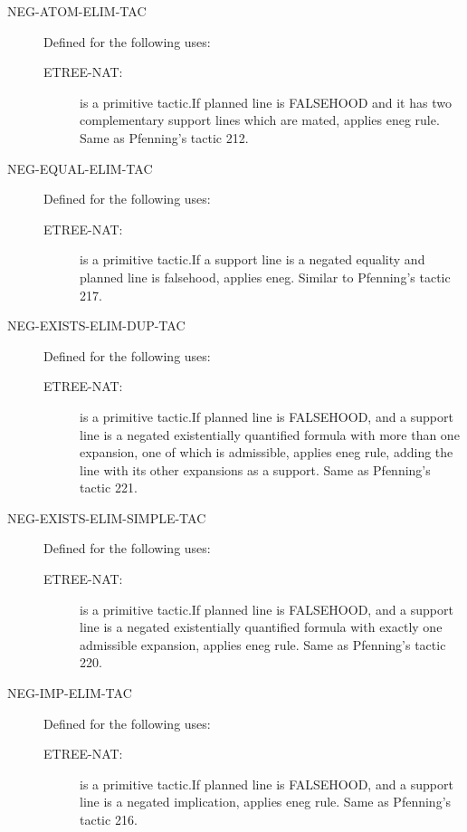 \begin{description}
\item[NEG-ATOM-ELIM-TAC]  Defined for the following uses:
\begin{description}
\item[ETREE-NAT:]  is a primitive tactic.If planned line is FALSEHOOD and it has two complementary support lines
which are mated, applies eneg rule.  Same as Pfenning's tactic 212.

\end{description}

\item[NEG-EQUAL-ELIM-TAC]  Defined for the following uses:
\begin{description}
\item[ETREE-NAT:]  is a primitive tactic.If a support line is a negated equality and planned line is falsehood,
applies eneg.  Similar to Pfenning's tactic 217.

\end{description}

\item[NEG-EXISTS-ELIM-DUP-TAC]  Defined for the following uses:
\begin{description}
\item[ETREE-NAT:]  is a primitive tactic.If planned line is FALSEHOOD, and a support line is a negated existentially
quantified formula with more than one expansion, one of which is admissible,
applies eneg rule, adding the line with its other expansions as a support.
Same as Pfenning's tactic 221.

\end{description}

\item[NEG-EXISTS-ELIM-SIMPLE-TAC]  Defined for the following uses:
\begin{description}
\item[ETREE-NAT:]  is a primitive tactic.If planned line is FALSEHOOD, and a support line is a negated existentially
quantified formula with exactly one admissible expansion, applies eneg rule.
Same as Pfenning's tactic 220.

\end{description}

\item[NEG-IMP-ELIM-TAC]  Defined for the following uses:
\begin{description}
\item[ETREE-NAT:]  is a primitive tactic.If planned line is FALSEHOOD, and a support line is a negated implication,
applies eneg rule.  Same as Pfenning's tactic 216.


\end{description}
\end{description}
